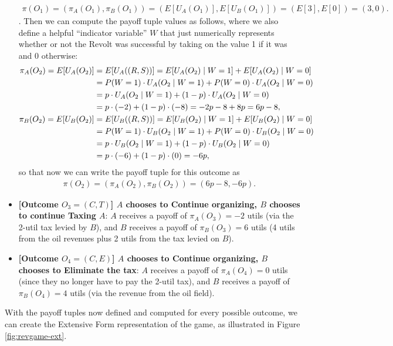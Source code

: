 \begin{itemize}
{		\begin{align*}
			\pi(O_1) = (\pi_A(O_1),\pi_B(O_1)) = (E[U_A(O_1)], E[U_B(O_1)]) = (E[3],E[0]) = (3,0).
	\end{align*}}. Then we can compute the payoff tuple values as follows, where we also define a helpful ``indicator variable'' $W$ that just numerically represents whether or not the Revolt was successful by taking on the value 1 if it was and 0 otherwise:
	\begin{align*}
		\pi_A(O_2) = E[U_A(O_2)] &= E[U_A((R,S))] = E[U_A(O_2)\; | \;{}W=1] + E[U_A(O_2)\; | \;{}W=0] \\
		&= P(W=1)\cdot U_A(O_2\; | \;{}W=1) + P(W=0)\cdot U_A(O_2\; | \;{}W=0) \\
		&= p\cdot U_A(O_2\; | \;{} W=1) + (1-p)\cdot U_A(O_2\; | \;{} W=0) \\
		&= p\cdot(-2) + (1-p)\cdot(-8) = -2p - 8 + 8p = 6p - 8, \\
		\pi_B(O_2) = E[U_B(O_2)] &= E[U_B((R,S))] = E[U_B(O_2)\; | \;{}W=1] + E[U_B(O_2)\; | \;{}W=0] \\
		&= P(W=1)\cdot U_B(O_2\; | \;{}W=1) + P(W=0)\cdot U_B(O_2\; | \;{}W=0) \\
		&= p\cdot U_B(O_2\; | \;{} W=1) + (1-p)\cdot U_B(O_2\; | \;{} W=0) \\
		&= p\cdot(-6) + (1-p)\cdot(0) = -6p,
	\end{align*}
	so that now we can write the payoff tuple for this outcome as
	\begin{align*}
		\pi(O_2) = (\pi_A(O_2),\pi_B(O_2)) = (6p-8,-6p).
	\end{align*}
	\item \textbf{[Outcome $O_3 = (C,T)$] $A$ chooses to Continue organizing, $B$ chooses to continue Taxing $A$}: $A$ receives a payoff of $\pi_A(O_3) = -2$ utils (via the 2-util tax levied by $B$), and $B$ receives a payoff of $\pi_B(O_3) = 6$ utils (4 utils from the oil revenues plus 2 utils from the tax levied on $B$).
	\item \textbf{[Outcome $O_4 = (C,E)$] $A$ chooses to Continue organizing, $B$ chooses to Eliminate the tax}: $A$ receives a payoff of $\pi_A(O_4) = 0$ utils (since they no longer have to pay the 2-util tax), and $B$ receives a payoff of $\pi_B(O_4) = 4$ utils (via the revenue from the oil field).
\end{itemize}
With the payoff tuples now defined and computed for every possible outcome, we can create the Extensive Form representation of the game, as illustrated in Figure \ref{fig:revgame-ext}.


